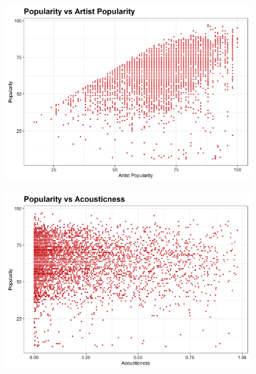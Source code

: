 \documentclass[12pt, twoside]{article}
\begin{document}
\begin{figure}[H]
\begin{subfigure}[b]{0.5\textwidth}
\centering
\includegraphics[width = \textwidth]{pop_vs_artist_pop.png}
\caption{}
\label{fig:danceability_trend}
\end{subfigure}
\begin{subfigure}[b]{0.5\textwidth}
\centering
\includegraphics[width = \textwidth]{pop_vs_track_acousticness.png}
\caption{}
\label{fig:instrumentalness_trend}
\end{subfigure}
\begin{subfigure}[b]{0.5\textwidth}
\centering

\end{subfigure}
\end{figure}
\end{document}
